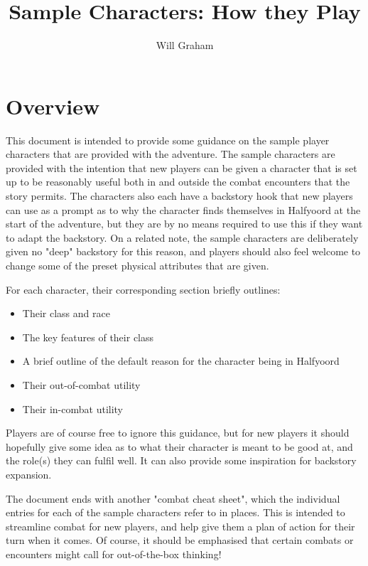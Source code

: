 \documentclass[10pt,a4paper]{article}
\title{Sample Characters: How they Play}
\author{Will Graham}
\begin{document}
\maketitle

\tableofcontents

\section{Overview}

This document is intended to provide some guidance on the sample player characters that are provided with the adventure.
The sample characters are provided with the intention that new players can be given a character that is set up to be reasonably useful both in and outside the combat encounters that the story permits.
The characters also each have a backstory hook that new players can use as a prompt as to why the character finds themselves in Halfyoord at the start of the adventure, but they are by no means required to use this if they want to adapt the backstory.
On a related note, the sample characters are deliberately given no "deep" backstory for this reason, and players should also feel welcome to change some of the preset physical attributes that are given.

For each character, their corresponding section briefly outlines:
\begin{itemize}
    \item Their class and race
    \item The key features of their class
    \item A brief outline of the default reason for the character being in Halfyoord
    \item Their out-of-combat utility
    \item Their in-combat utility
\end{itemize}

Players are of course free to ignore this guidance, but for new players it should hopefully give some idea as to what their character is meant to be good at, and the role(s) they can fulfil well.
It can also provide some inspiration for backstory expansion.

The document ends with another "combat cheat sheet", which the individual entries for each of the sample characters refer to in places.
This is intended to streamline combat for new players, and help give them a plan of action for their turn when it comes.
Of course, it should be emphasised that certain combats or encounters might call for out-of-the-box thinking!
\end{document}

